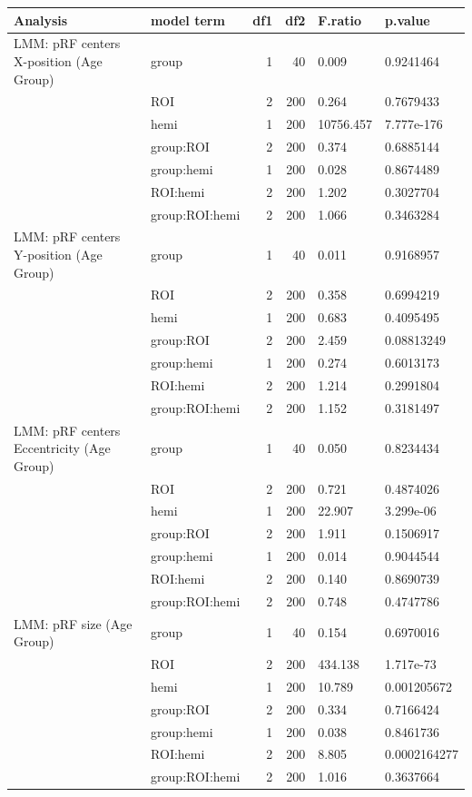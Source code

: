 \begin{table}
\centering
\begin{tabular}{llrrll}
\toprule
Analysis & model term & df1 & df2 & F.ratio & p.value\\
\midrule
LMM: pRF centers X-position (Age Group) & group & 1 & 40 & 0.009 & 0.9241464\\
 & ROI & 2 & 200 & 0.264 & 0.7679433\\
 & hemi & 1 & 200 & 10756.457 & 7.777e-176\\
 & group:ROI & 2 & 200 & 0.374 & 0.6885144\\
 & group:hemi & 1 & 200 & 0.028 & 0.8674489\\
\addlinespace
 & ROI:hemi & 2 & 200 & 1.202 & 0.3027704\\
 & group:ROI:hemi & 2 & 200 & 1.066 & 0.3463284\\
LMM: pRF centers Y-position (Age Group) & group & 1 & 40 & 0.011 & 0.9168957\\
 & ROI & 2 & 200 & 0.358 & 0.6994219\\
 & hemi & 1 & 200 & 0.683 & 0.4095495\\
\addlinespace
 & group:ROI & 2 & 200 & 2.459 & 0.08813249\\
 & group:hemi & 1 & 200 & 0.274 & 0.6013173\\
 & ROI:hemi & 2 & 200 & 1.214 & 0.2991804\\
 & group:ROI:hemi & 2 & 200 & 1.152 & 0.3181497\\
LMM: pRF centers Eccentricity (Age Group) & group & 1 & 40 & 0.050 & 0.8234434\\
\addlinespace
 & ROI & 2 & 200 & 0.721 & 0.4874026\\
 & hemi & 1 & 200 & 22.907 & 3.299e-06\\
 & group:ROI & 2 & 200 & 1.911 & 0.1506917\\
 & group:hemi & 1 & 200 & 0.014 & 0.9044544\\
 & ROI:hemi & 2 & 200 & 0.140 & 0.8690739\\
\addlinespace
 & group:ROI:hemi & 2 & 200 & 0.748 & 0.4747786\\
LMM: pRF size (Age Group) & group & 1 & 40 & 0.154 & 0.6970016\\
 & ROI & 2 & 200 & 434.138 & 1.717e-73\\
 & hemi & 1 & 200 & 10.789 & 0.001205672\\
 & group:ROI & 2 & 200 & 0.334 & 0.7166424\\
\addlinespace
 & group:hemi & 1 & 200 & 0.038 & 0.8461736\\
 & ROI:hemi & 2 & 200 & 8.805 & 0.0002164277\\
 & group:ROI:hemi & 2 & 200 & 1.016 & 0.3637664\\
\bottomrule
\end{tabular}
\end{table}
